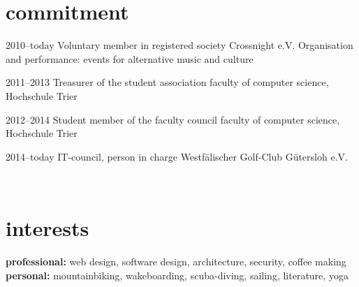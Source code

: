 \documentclass[]{friggeri-cv} %
\begin{document}
\newpage

\section{commitment}

\begin{entrylist}


\entry
{2010--today}
{Voluntary member in registered society Crossnight e.V.}
{}
{Organisation and performance: events for alternative music and culture}


\entry
{2011--2013}
{Treasurer of the student association}
{}
{faculty of computer science, Hochschule Trier}


\entry
{2012--2014}
{Student member of the faculty council}
{}
{faculty of computer science, Hochschule Trier}


\entry
{2014--today}
{IT-council, person in charge}
{}
{Westf\"{a}lischer Golf-Club G\"{u}tersloh e.V.}

\\
\end{entrylist}


\section{interests}
\textbf{professional:} web design, software design, architecture, security, coffee making
\\
\textbf{personal:} mountainbiking, wakeboarding, scuba-diving, sailing, literature, yoga

\end{document}
